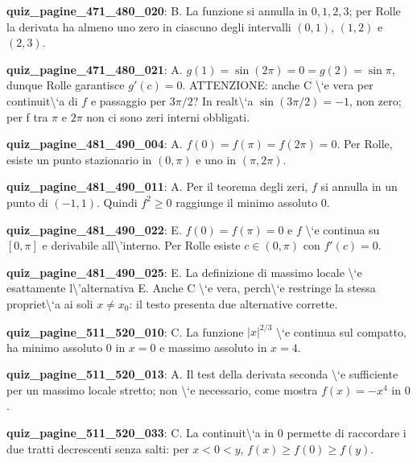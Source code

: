 \documentclass[11pt,a4paper]{article}
\newcounter{quiz}
\begin{document}
\noindent\textbf{quiz\_pagine\_471\_480\_020}: B. La funzione si annulla in $0,1,2,3$; per Rolle la derivata ha almeno uno zero in ciascuno degli intervalli $(0,1)$, $(1,2)$ e $(2,3)$.\par\medskip
\noindent\textbf{quiz\_pagine\_471\_480\_021}: A. $g(1)=\sin(2\pi)=0=g(2)=\sin\pi$, dunque Rolle garantisce $g'(c)=0$. ATTENZIONE: anche C \textbackslash{}`e vera per continuit\textbackslash{}`a di $f$ e passaggio per $3\pi/2$? In realt\textbackslash{}`a $\sin(3\pi/2)=-1$, non zero; per f tra $\pi$ e $2\pi$ non ci sono zeri interni obbligati.\par\medskip
\noindent\textbf{quiz\_pagine\_481\_490\_004}: A. $f(0)=f(\pi)=f(2\pi)=0$. Per Rolle, esiste un punto stazionario in $(0,\pi)$ e uno in $(\pi,2\pi)$.\par\medskip
\noindent\textbf{quiz\_pagine\_481\_490\_011}: A. Per il teorema degli zeri, $f$ si annulla in un punto di $(-1,1)$. Quindi $f^2\ge0$ raggiunge il minimo assoluto $0$.\par\medskip
\noindent\textbf{quiz\_pagine\_481\_490\_022}: E. $f(0)=f(\pi)=0$ e $f$ \textbackslash{}`e continua su $[0,\pi]$ e derivabile all\textbackslash{}'interno. Per Rolle esiste $c\in(0,\pi)$ con $f\prime(c)=0$.\par\medskip
\noindent\textbf{quiz\_pagine\_481\_490\_025}: E. La definizione di massimo locale \textbackslash{}`e esattamente l\textbackslash{}'alternativa E. Anche C \textbackslash{}`e vera, perch\textbackslash{}`e restringe la stessa propriet\textbackslash{}`a ai soli $x\ne x_0$: il testo presenta due alternative corrette.\par\medskip
\noindent\textbf{quiz\_pagine\_511\_520\_010}: C. La funzione $|x|^{2/3}$ \textbackslash{}`e continua sul compatto, ha minimo assoluto $0$ in $x=0$ e massimo assoluto in $x=4$.\par\medskip
\noindent\textbf{quiz\_pagine\_511\_520\_013}: A. Il test della derivata seconda \textbackslash{}`e sufficiente per un massimo locale stretto; non \textbackslash{}`e necessario, come mostra $f(x)=-x^4$ in $0$.\par\medskip
\noindent\textbf{quiz\_pagine\_511\_520\_033}: C. La continuit\textbackslash{}`a in $0$ permette di raccordare i due tratti decrescenti senza salti: per $x<0<y$, $f(x)\ge f(0)\ge f(y)$.\par\medskip
\end{document}
